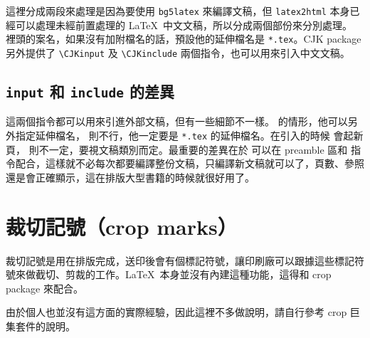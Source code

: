 這裡分成兩段來處理是因為要使用 \texttt{bg5latex} 來編譯文稿，但 \texttt{latex2html} 本身已經可以處理未經前置處理的 \LaTeX\ 中文文稿，所以分成兩個部份來分別處理。\verb|| 裡頭的案名，如果沒有加附檔名的話，預設他的延伸檔名是 \texttt{*.tex}。\textsf{CJK} package 另外提供了 \verb|\CJKinput| 及 \verb|\CJKinclude| 兩個指令，也可以用來引入中文文稿。

\subsection{\texttt{input} 和 \texttt{include} 的差異}

這兩個指令都可以用來引進外部文稿，但有一些細節不一樣。\verb|| 的情形，他可以另外指定延伸檔名，\verb|| 則不行，他一定要是 \texttt{*.tex} 的延伸檔名。在引入的時候 \verb|| 會起新頁，\verb|| 則不一定，要視文稿類別而定。最重要的差異在於 \verb|| 可以在 preamble 區和 \verb|| 指令配合，這樣就不必每次都要編譯整份文稿，只編譯新文稿就可以了，頁數、參照還是會正確顯示，這在排版大型書籍的時候就很好用了。

\section{裁切記號（crop marks）}
\label{sec:crop}

裁切記號是用在排版完成，送印後會有個標記符號，讓印刷廠可以跟據這些標記符號來做截切、剪裁的工作。\LaTeX\ 本身並沒有內建這種功能，這得和 \textsf{crop} package 來配合。

由於個人也並沒有這方面的實際經驗，因此這裡不多做說明，請自行參考 \textsf{crop} 巨集套件的說明。

